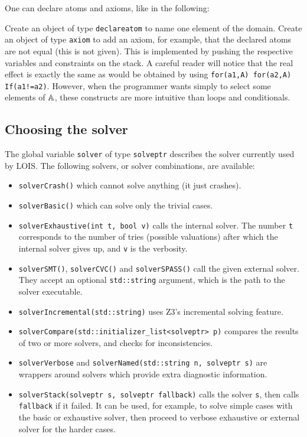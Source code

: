 One can declare atoms and axioms, like in the following:

Create an object of type \verb-declareatom- to name one element of the domain.
Create an object of type \verb-axiom- to add an axiom, for example, that the
declared atoms are not equal (this is not given). This is implemented by
pushing the respective variables and constraints on the stack. A careful reader
will notice that the real effect is exactly the same as would be obtained by using
\verb-for(a1,A) for(a2,A) If(a1!=a2)-. However, when the programmer wants simply to
select some elements of ${\mathbb A}$, these constructs are more intuitive than loops and
conditionals.


%
%
%

\subsection{Choosing the solver}
The global variable {\tt solver} of type {\tt solveptr} describes the solver currently
used by LOIS. The following solvers, or solver combinations, are available:

\begin{itemize}
\item {\tt solverCrash()} which cannot solve anything (it just crashes).
\item {\tt solverBasic()} which can solve only the trivial cases.
\item {\tt solverExhaustive(int t, bool v)} calls the internal solver. The number 
{\tt t} corresponds to the number of tries (possible valuations) after which the
internal solver gives up, and {\tt v} is the verbosity.
\item {\tt solverSMT()}, {\tt solverCVC()} and {\tt solverSPASS()} call the given
external solver. They accept an optional {\tt std::string} argument, which is the path to the solver
executable.
\item {\tt solverIncremental(std::string)} uses Z3's incremental solving feature.
\item {\tt solverCompare(std::initializer\_list<solveptr> p)} compares the results of two or more solvers,
and checks for inconsistencies.
\item {\tt solverVerbose} and {\tt solverNamed(std::string n, solveptr s)} are wrappers 
around solvers which provide extra diagnostic information.
\item {\tt solverStack(solveptr s, solveptr fallback)} calls the solver {\tt s},
then calls {\tt fallback} if it failed. It can be used, for example, to solve simple cases with the
basic or exhaustive solver, then proceed to verbose exhaustive or external solver for
the harder cases.
\end{itemize}

